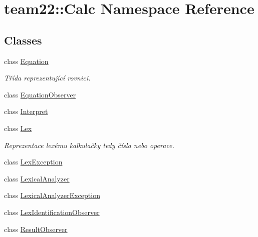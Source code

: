 \hypertarget{namespaceteam22_1_1_calc}{}\section{team22\+:\+:Calc Namespace Reference}
\label{namespaceteam22_1_1_calc}
\subsection*{Classes}
\begin{DoxyCompactItemize}
\item 
class \hyperlink{classteam22_1_1_calc_1_1_equation}{Equation}
\begin{DoxyCompactList}\small\item\em Třída reprezentující rovnici. \end{DoxyCompactList}\item 
class \hyperlink{classteam22_1_1_calc_1_1_equation_observer}{Equation\+Observer}
\item 
class \hyperlink{classteam22_1_1_calc_1_1_interpret}{Interpret}
\item 
class \hyperlink{classteam22_1_1_calc_1_1_lex}{Lex}
\begin{DoxyCompactList}\small\item\em Reprezentace lexému kalkulačky tedy čísla nebo operace. \end{DoxyCompactList}\item 
class \hyperlink{classteam22_1_1_calc_1_1_lex_exception}{Lex\+Exception}
\item 
class \hyperlink{classteam22_1_1_calc_1_1_lexical_analyzer}{Lexical\+Analyzer}
\item 
class \hyperlink{classteam22_1_1_calc_1_1_lexical_analyzer_exception}{Lexical\+Analyzer\+Exception}
\item 
class \hyperlink{classteam22_1_1_calc_1_1_lex_identification_observer}{Lex\+Identification\+Observer}
\item 
class \hyperlink{classteam22_1_1_calc_1_1_result_observer}{Result\+Observer}
\end{DoxyCompactItemize}
